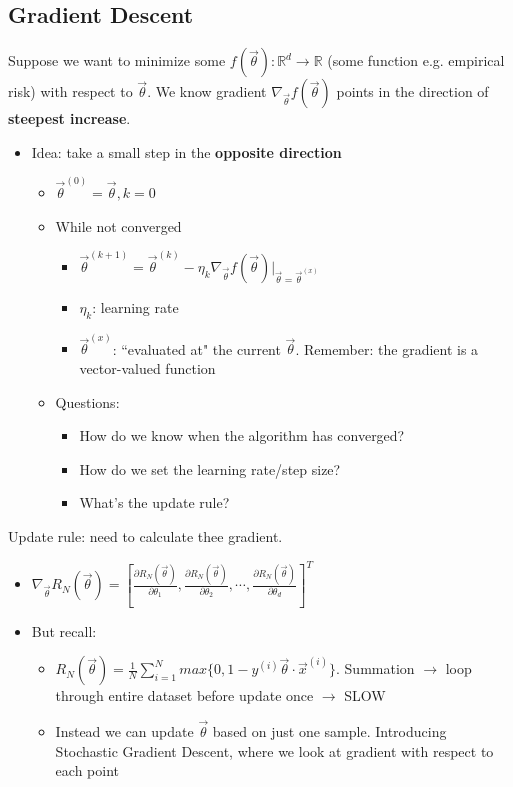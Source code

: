 \documentclass[10pt, oneside]{article}
\newcommand{\R}{\mathbb{R}}
\begin{document}
\subsection{Gradient Descent}
Suppose we want to minimize some $f(\vec \theta): \R^d \rightarrow \R$ (some function e.g. empirical risk) with respect to $\vec \theta$. We know gradient $\nabla_{\vec\theta}f(\vec \theta)$ points in the direction of \textbf{steepest increase}.
\begin{itemize}
    \item Idea: take a small step in the \textbf{opposite direction}
    \begin{itemize}
        \item $\vec \theta ^{(0)} = \vec \theta, k=0$
        \item While not converged
        \begin{itemize}
            \item $\vec \theta ^{(k+1)} = \vec \theta ^{(k)} - \eta_k \nabla_{\vec\theta} f(\vec \theta)|_{\vec\theta=\vec\theta^{(x)}}$
            \item $\eta_k$: learning rate
            \item $\vec\theta^{(x)}$: ``evaluated at" the current $\vec \theta$. Remember: the gradient is a vector-valued function
        \end{itemize}
        \item Questions:
        \begin{itemize}
            \item How do we know when the algorithm has converged?
            \item How do we set the learning rate/step size?
            \item What's the update rule?
        \end{itemize}
    \end{itemize}
\end{itemize}
Update rule: need to calculate thee gradient.
\begin{itemize}
    \item $\nabla_{\vec \theta} R_N (\vec \theta)=[\frac{\partial R_N(\vec \theta)}{\partial\theta_1}, \frac{\partial R_N(\vec \theta)}{\partial\theta_2},\cdots, \frac{\partial R_N(\vec \theta)}{\partial\theta_d}]^T$
    \item But recall:
    \begin{itemize}
        \item $R_N(\vec \theta)= \frac{1}{N} \sum_{i=1} ^N max\{0, 1-y^{(i)} \vec \theta\cdot \vec x ^{(i)}\}$. Summation $\rightarrow$ loop through entire dataset before update once $\rightarrow$ SLOW
        \item Instead we can update $\vec \theta$ based on just one sample. Introducing Stochastic Gradient Descent, where we look at gradient with respect to each point
    \end{itemize}
\end{itemize}
\end{document}

